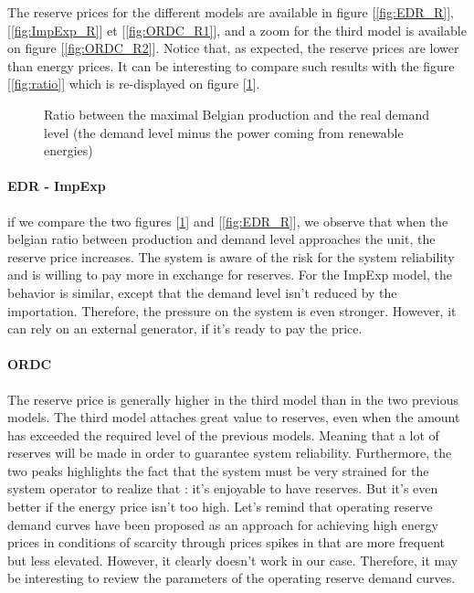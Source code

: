 
The reserve prices for the different models are available in figure [\ref{fig:EDR_R}], [\ref{fig:ImpExp_R}] et [\ref{fig:ORDC_R1}], and a zoom for the third model  is available on figure [\ref{fig:ORDC_R2}]. Notice that, as expected, the reserve prices are lower than energy prices. It can be interesting to  compare such results with the figure [\ref{fig:ratio}] which is re-displayed on figure [\ref{fig:ratio2}].

\begin{figure}[H]
    \centering
    \setlength\fheight{4cm}
    \setlength{}
    
    \caption{Ratio between the maximal Belgian production and the real demand level (the demand level minus the power coming from renewable energies)}
    \label{fig:ratio2}
\end{figure}

\paragraph{EDR - ImpExp} if we compare the two figures [\ref{fig:ratio2}] and [\ref{fig:EDR_R}], we observe that when the belgian ratio between production and demand level approaches the unit, the reserve price increases. The system is aware of the risk for the system reliability and is willing to pay more in exchange for reserves. For the ImpExp model, the behavior is similar, except that the demand level isn't reduced by the importation. Therefore, the pressure on the system is even stronger. However, it can rely on an external generator, if it's ready to pay the price.

\paragraph{ORDC} The reserve price is generally higher in the third model than in the two previous models. The third model attaches great value to reserves, even when the amount has exceeded the required level of the previous models. Meaning that a lot of reserves will be made in order to guarantee system reliability. Furthermore, the two peaks highlights the fact that the system must be very strained for the system operator to realize that : it's enjoyable to have reserves. But it's even better if the energy price isn't too high. Let's remind that operating reserve demand curves have been proposed as an approach for achieving high energy prices in conditions of scarcity through prices spikes in that are more frequent but less elevated. However, it clearly doesn't work in our case. Therefore, it may be interesting to review the parameters of the operating reserve demand curves. 


